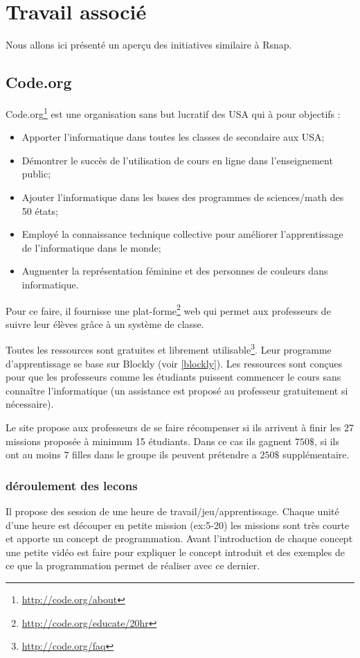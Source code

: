 \section{Travail associé}
Nous allons ici présenté un aperçu des initiatives similaire à Rsnap.
\subsection{Code.org}
Code.org\footnote{\url{http://code.org/about}} est une organisation sans but lucratif des USA qui à pour objectifs :
\begin{itemize}
  \item Apporter l'informatique dans toutes les classes de secondaire aux USA;
  \item Démontrer le succès de l'utilisation de cours en ligne dans l'enseignement public;
  \item Ajouter l'informatique dans les bases des programmes de sciences/math des 50 états;
  \item Employé la connaissance technique collective pour améliorer l'apprentissage de l'informatique dans le monde;
  \item Augmenter la représentation féminine et des personnes de couleurs dans informatique.
\end{itemize}

Pour ce faire, il fournisse une plat-forme\footnote{\url{http://code.org/educate/20hr}} web qui permet aux professeurs de suivre leur élèves grâce à un système de classe.

Toutes les ressources sont gratuites et librement utilisable\footnote{\url{http://code.org/faq}}. Leur programme d'apprentissage se base sur Blockly (voir \ref{blockly}).
Les ressources sont conçues pour que les professeurs comme les étudiants puissent commencer le cours sans connaître l'informatique (un assistance est proposé au professeur gratuitement si nécessaire).

Le site propose aux professeurs de se faire récompenser si ils arrivent à finir les 27 missions proposée à  minimum 15 étudiants. Dans ce cas ils gagnent $750\$$, si ils ont au moins 7 filles dans le groupe ils peuvent prétendre a $250\$$ supplémentaire.

\subsubsection{déroulement des lecons}
Il propose des session de une heure de travail/jeu/apprentissage. Chaque unité d'une heure est découper en petite mission (ex:5-20) les missions sont très courte et apporte un concept de programmation. Avant l'introduction de chaque concept une petite vidéo est faire pour expliquer le concept introduit et des exemples de ce que la programmation permet de réaliser avec ce dernier.

